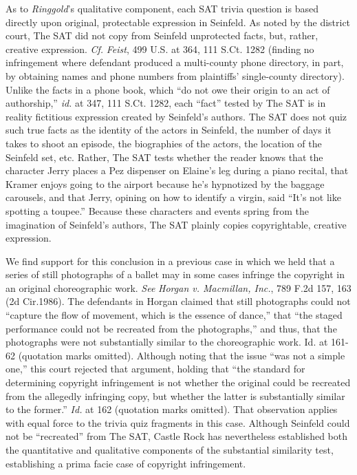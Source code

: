 As to \emph{Ringgold}'s qualitative component, each SAT trivia question is based
directly upon original, protectable expression in Seinfeld. As noted by the
district court, The SAT did not copy from Seinfeld unprotected facts, but,
rather, creative expression. \emph{Cf.} \emph{Feist}, 499 U.S. at 364, 111 S.Ct.
1282
(finding no infringement where defendant produced a multi-county phone
directory, in part, by obtaining names and phone numbers from plaintiffs'
single-county directory). Unlike the facts in a phone book, which ``do not owe
their origin to an act of authorship,'' \emph{id.} at 347, 111 S.Ct. 1282, each
``fact'' tested by The SAT is in reality fictitious expression created by
Seinfeld's authors. The SAT does not quiz such true facts as the identity of
the actors in Seinfeld, the number of days it takes to shoot an episode, the
biographies of the actors, the location of the Seinfeld set, etc. Rather, The
SAT tests whether the reader knows that the character Jerry places a Pez
dispenser on Elaine's leg during a piano recital, that Kramer enjoys going to
the airport because he's hypnotized by the baggage carousels, and that Jerry,
opining on how to identify a virgin, said ``It's not like spotting a toupee.''
Because these characters and events spring from the imagination of Seinfeld's
authors, The SAT plainly copies copyrightable, creative expression.

We find support for this conclusion in a previous case in which we held that a
series of still photographs of a ballet may in some cases infringe the
copyright in an original choreographic work. \emph{See} \emph{Horgan v.
Macmillan, Inc.}, 789
F.2d 157, 163 (2d Cir.1986). The defendants in Horgan claimed that still
photographs could not ``capture the flow of movement, which is the essence of
dance,'' that ``the staged performance could not be recreated from the
photographs,'' and thus, that the photographs were not substantially similar to
the choreographic work. Id. at 161-62 (quotation marks omitted). Although
noting that the issue ``was not a simple one,'' this court rejected that
argument, holding that ``the standard for determining copyright infringement is
not whether the original could be recreated from the allegedly infringing copy,
but whether the latter is substantially similar to the former.'' \emph{Id.} at
162
(quotation marks omitted). That observation applies with equal force to the
trivia quiz fragments in this case. Although Seinfeld could not be
``recreated'' from The SAT, Castle Rock has nevertheless established both the
quantitative and qualitative components of the substantial similarity test,
establishing a prima facie case of copyright infringement.

